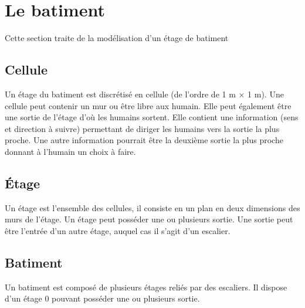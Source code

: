 %
\section{Le batiment}
%
Cette section traite de la modélisation d'un étage de batiment
%
\subsection{Cellule}
Un étage du batiment est discrétisé en cellule (de l'ordre de 1 m $\times$ 1 m). Une cellule peut contenir un mur ou être libre aux humain. Elle peut également être une sortie de l'étage d'où les humains sortent. Elle contient une information (sens et direction à suivre) permettant de diriger les humains vers la sortie la plus proche. Une autre information pourrait être la deuxième sortie la plus proche donnant à l'humain un choix à faire.
%
%
\subsection{Étage}
Un étage est l'ensemble des cellules, il consiste en un plan en deux dimensions des murs de l'étage. Un étage peut posséder une ou plusieurs sortie. Une sortie peut être l'entrée d'un autre étage, auquel cas il s'agit d'un escalier.
%
%
\subsection{Batiment}
Un batiment est composé de plusieurs étages reliés par des escaliers. Il dispose d'un étage 0 pouvant posséder une ou plusieurs sortie.
